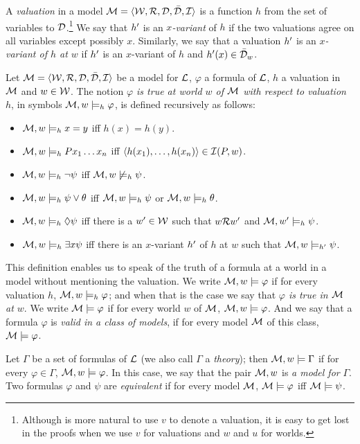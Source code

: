 \begin{defn}
A \textit{valuation} in a model $\mathcal{M} = \langle\mathcal{W},\mathcal{R}, \mathcal{D}, \bar{\mathcal{D}},\mathcal{I}\rangle$ is a function $h$ from the set of variables to $\mathcal{D}$.\footnote{Although is more natural to use $v$ to denote a valuation, it is easy to get lost in the proofs when we use $v$ for valuations and $w$ and $u$ for worlds.} We say that $h^{\prime}$ is an $x$\textit{-variant} of $h$ if the two valuations agree on all variables except possibly $x$. Similarly, we say that a valuation $h^{\prime}$ is an $x$\textit{-variant of $h$ at $w$} if $h^{\prime}$ is an $x$-variant of $h$ and $h^{\prime}(x) \in \bar{\mathcal{D}}_w$.
\end{defn}

\begin{defn}
Let $\mathcal{M} = \langle\mathcal{W},\mathcal{R}, \mathcal{D}, \bar{\mathcal{D}},\mathcal{I}\rangle$ be a model for $\mathcal{L}$, $\varphi$ a formula of $\mathcal{L}$, $h$ a valuation in $\mathcal{M}$ and $w \in \mathcal{W}$. The notion \textit{$\varphi$ is true at world $w$ of $\mathcal{M}$ with respect to valuation $h$}, in symbols $\mathcal{M},w \models_{h} \varphi$, is defined recursively as follows: 

\begin{itemize} 
\item[] $\mathcal{M},w \models_{h} x = y$ iff $h(x) = h(y)$. 
\item[] $\mathcal{M},w \models_{h} Px_{1} \dots x_{n}$ iff $\langle h(x_{1}), \dots, h(x_{n})\rangle \in \mathcal{I}(P,w)$. 
\item[] $\mathcal{M},w \models_{h} \neg \psi$ iff $\mathcal{M},w \not\models_{h} \psi$.
\item[] $\mathcal{M},w \models_{h} \psi \vee \theta$ iff $\mathcal{M},w \models_{h} \psi$ or $\mathcal{M},w \models_{h} \theta$.
\item[] $\mathcal{M},w \models_{h} \Diamond \psi$ iff there is a $w^{\prime} \in \mathcal{W}$ such that $w\mathcal{R} w^{\prime}$ and $\mathcal{M},w^{\prime} \models_{h} \psi$.
\item[] $\mathcal{M},w \models_{h} \exists x \psi$ iff there is an $x$-variant $h^{\prime}$ of $h$ at $w$ such that $\mathcal{M},w \models_{h^{\prime}} \psi$.
\end{itemize}

\qquad This definition enables us to speak of the truth of a formula at a world in a model without mentioning the valuation. We write $\mathcal{M},w \models \varphi$ if for every valuation $h$, $\mathcal{M},w \models_{h} \varphi$; and when that is the case we say that \textit{$\varphi$ is true in $\mathcal{M}$ at $w$}. We write $\mathcal{M} \models \varphi$ if for every world $w$ of $\mathcal{M}$, $\mathcal{M},w \models \varphi$. And we say that a formula $\varphi$ is\textit{ valid in a class of models}, if for every model $\mathcal{M}$ of this class, $\mathcal{M} \models \varphi$.

\qquad Let $\Gamma$ be a set of formulas of $\mathcal{L}$ (we also call $\Gamma$ a \textit{theory}); then $\mathcal{M},w \models \Gamma$ if for every $\varphi \in \Gamma$, $\mathcal{M},w \models \varphi$. In this case, we say that the pair  $\mathcal{M},w$ is \textit{a model for} $\Gamma$. Two formulas $\varphi$ and $\psi$ are \textit{equivalent} if for every model $\mathcal{M}$, $\mathcal{M} \models \varphi$ iff $\mathcal{M} \models \psi$.


\end{defn}

